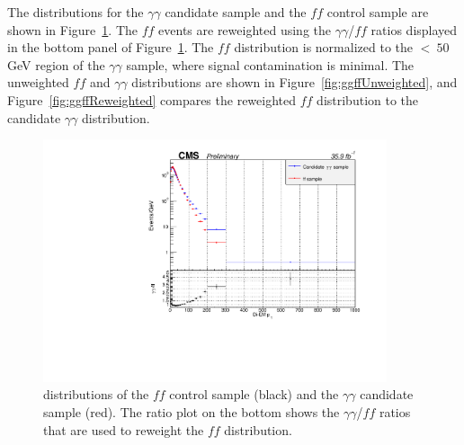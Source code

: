 The \diempt distributions for the $\gamma\gamma$ candidate sample and the $ff$ control sample are shown in Figure~\ref{fig:ggffDiempt}. The $ff$ events are reweighted using the $\gamma\gamma$/$ff$ ratios displayed in the bottom panel of Figure~\ref{fig:ggffDiempt}. The $ff$ \ETmiss distribution is normalized to the \ETmiss $<~50$ GeV region of the $\gamma\gamma$ sample, where signal contamination is minimal. The unweighted $ff$ and $\gamma\gamma$ \ETmiss distributions are shown in Figure~\ref{fig:ggffUnweighted}, and Figure~\ref{fig:ggffReweighted} compares the reweighted $ff$ \ETmiss distribution to the candidate $\gamma\gamma$ \ETmiss distribution.

\begin{figure}[h]
\begin{center}
\includegraphics[width=0.9\textwidth]{Figures/DataAnalysis/ggffDiempt.pdf}
\end{center}
\caption{\Diempt distributions of the $ff$ control sample (black) and the $\gamma\gamma$ candidate sample (red). The ratio plot on the bottom shows the $\gamma\gamma$/$ff$ ratios that are used to reweight the $ff$ \ETmiss distribution. }
\label{fig:ggffDiempt}
\end{figure}


